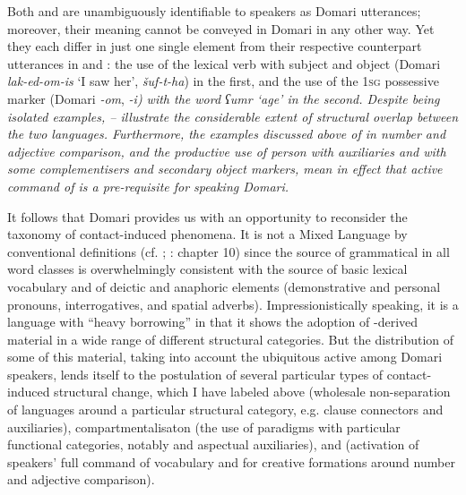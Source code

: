 \documentclass[output=paper]{langsci/langscibook}
\begin{document}
Both  and  are unambiguously identifiable to speakers as Domari utterances; moreover, their meaning cannot be conveyed in Domari in any other way. Yet they each differ in just one single element from their respective counterpart  utterances in  and : the use of the lexical verb with subject and object  (Domari \textit{lak-ed-om-is} ‘I saw her’,  \textit{šuf-t-ha}) in the first, and the use of the \textsc{1sg} possessive marker (Domari \-\textit{{}-om},  \textit{-i\textup{) with the word} ʕumr \textup{‘age’ in the second. Despite being isolated examples, – illustrate the considerable extent of structural overlap between the two languages. Furthermore, the examples discussed above of  in number  and adjective comparison, and the productive use of  person   with auxiliaries and with some complementisers and secondary object markers, mean in effect that active command of  is a pre-requisite for speaking Domari.}}

It follows that Domari provides us with an opportunity to reconsider the taxonomy of contact-induced  phenomena. It is not a Mixed Language by conventional definitions (cf. \citealt{BakkerMatras2013}; \citealt{Matras2009}: chapter 10) since the  source of grammatical  in all word classes is overwhelmingly consistent with the source of basic lexical vocabulary and of deictic and anaphoric elements (demonstrative and personal pronouns, interrogatives, and spatial adverbs). Impressionistically speaking, it is a language with ``heavy borrowing'' in that it shows the adoption of -derived material in a wide range of different structural categories. But the distribution of some of this material, taking into account the ubiquitous active  among Domari speakers,  lends itself to the postulation of several particular types of contact-induced structural change, which I have labeled above  (wholesale non-separation of languages around a particular structural category, e.g. clause connectors and  auxiliaries),  compartmentalisaton (the use of   paradigms with particular functional categories, notably  and aspectual auxiliaries), and  (activation of speakers’ full command of  vocabulary and  for creative formations around number  and adjective comparison).
\end{document}
